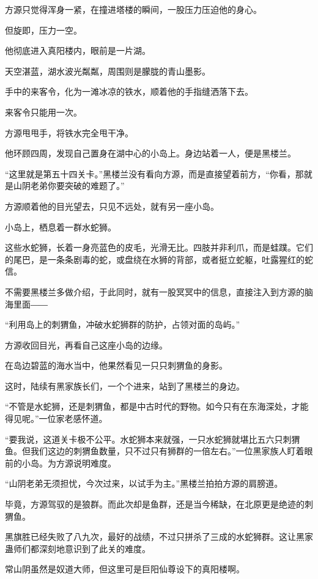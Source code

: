 
\begin{this_body}

方源只觉得浑身一紧，在撞进塔楼的瞬间，一股压力压迫他的身心。

但旋即，压力一空。

他彻底进入真阳楼内，眼前是一片湖。

天空湛蓝，湖水波光粼粼，周围则是朦胧的青山墨影。

手中的来客令，化为一滩冰凉的铁水，顺着他的手指缝洒落下去。

来客令只能用一次。

方源甩甩手，将铁水完全甩干净。

他环顾四周，发现自己置身在湖中心的小岛上。身边站着一人，便是黑楼兰。

“这里就是第五十四关卡。”黑楼兰没有看向方源，而是直接望着前方，“你看，那就是山阴老弟你要突破的难题了。”

方源顺着他的目光望去，只见不远处，就有另一座小岛。

小岛上，栖息着一群水蛇狮。

这些水蛇狮，长着一身亮蓝色的皮毛，光滑无比。四肢并非利爪，而是蛙蹼。它们的尾巴，是一条条剧毒的蛇，或盘绕在水狮的背部，或者挺立蛇躯，吐露猩红的蛇信。

不需要黑楼兰多做介绍，于此同时，就有一股冥冥中的信息，直接注入到方源的脑海里面――

“利用岛上的刺猬鱼，冲破水蛇狮群的防护，占领对面的岛屿。”

方源收回目光，再看自己这座小岛的边缘。

在岛边碧蓝的海水当中，他果然看见一只只刺猬鱼的身影。

这时，陆续有黑家族长们，一个个进来，站到了黑楼兰的身边。

“不管是水蛇狮，还是刺猬鱼，都是中古时代的野物。如今只有在东海深处，才能得见呢。”一位家老感怀道。

“要我说，这道关卡极不公平。水蛇狮本来就强，一只水蛇狮就堪比五六只刺猬鱼。但我们这边的刺猬鱼数量，只不过只有狮群的一倍左右。”一位黑家族人盯着眼前的小岛。为方源说明难度。

“山阴老弟无须担忧，今次过来，以试手为主。”黑楼兰拍拍方源的肩膀道。

毕竟，方源驾驭的是狼群。而此次却是鱼群，还是当今稀缺，在北原更是绝迹的刺猬鱼。

黑旗胜已经失败了八九次，最好的战绩，不过只拼杀了三成的水蛇狮群。这让黑家蛊师们都深刻地意识到了此关的难度。

常山阴虽然是奴道大师，但这里可是巨阳仙尊设下的真阳楼啊。


\end{this_body}
